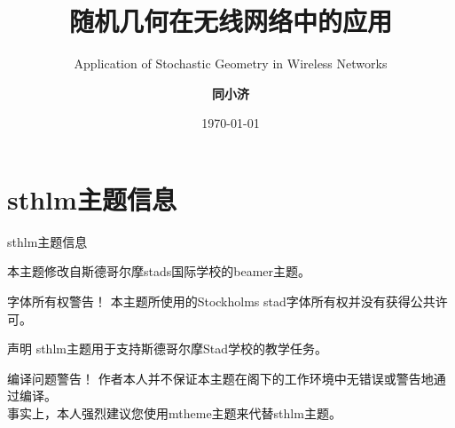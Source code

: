 \documentclass[newPxFont,sthlmFooter]{beamer}
\title{随机几何在无线网络中的应用}
\subtitle{Application of Stochastic Geometry in Wireless Networks}
\author{\textbf{同小济}}
\institute{\small{yourname@gmail.com}}
\date{\today}
\begin{document}
%
%

\maketitle


%
%

\section*{sthlm主题信息}


\begin{frame}[c]{sthlm主题信息}

{本主题修改自斯德哥尔摩stads国际学校的beamer主题}。

\vspace{1em}

\begin{alertblock}{字体所有权警告！}
本主题所使用的Stockholms stad字体所有权并没有获得公共许可。 
\end{alertblock}

\end{frame}


\begin{frame}[c]{声明}
sthlm主题用于支持斯德哥尔摩Stad学校的教学任务。 \\

\vspace{1em}

\begin{alertblock}{编译问题警告！}
作者本人并不保证本主题在阁下的工作环境中无错误或警告地通过编译。 \\
\vspace{1em}
事实上，本人强烈建议您使用mtheme主题来代替sthlm主题。
\end{alertblock}

\end{frame}
\end{document}

